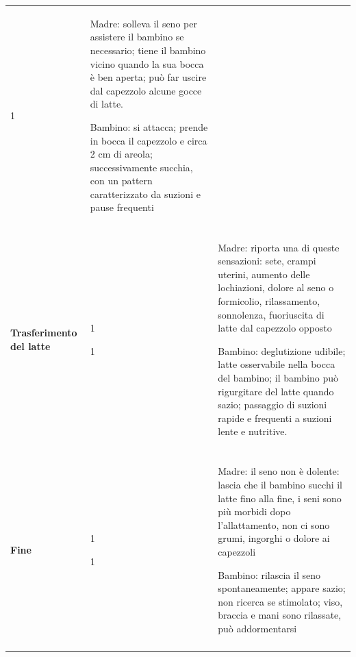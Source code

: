 \documentclass[]{article}
\begin{document}
\begin{longtable}[]{@{}lll@{}}
\begin{minipage}[t]{0.30\columnwidth}
1\strut
\end{minipage} & \begin{minipage}[t]{0.30\columnwidth}\raggedright
Madre: solleva il seno per assistere il bambino se necessario; tiene il
bambino vicino quando la sua bocca è ben aperta; può far uscire dal
capezzolo alcune gocce di latte.

Bambino: si attacca; prende in bocca il capezzolo e circa 2 cm di
areola; successivamente succhia, con un pattern caratterizzato da
suzioni e pause frequenti\strut
\end{minipage}\tabularnewline
& &\tabularnewline
\begin{minipage}[t]{0.30\columnwidth}\raggedright
\textbf{Trasferimento del latte}\strut
\end{minipage} & \begin{minipage}[t]{0.30\columnwidth}\raggedright
1

1\strut
\end{minipage} & \begin{minipage}[t]{0.30\columnwidth}\raggedright
Madre: riporta una di queste sensazioni: sete, crampi uterini, aumento
delle lochiazioni, dolore al seno o formicolio, rilassamento,
sonnolenza, fuoriuscita di latte dal capezzolo opposto

Bambino: deglutizione udibile; latte osservabile nella bocca del
bambino; il bambino può rigurgitare del latte quando sazio; passaggio di
suzioni rapide e frequenti a suzioni lente e nutritive.\strut
\end{minipage}\tabularnewline
& &\tabularnewline
\begin{minipage}[t]{0.30\columnwidth}\raggedright
\textbf{Fine}\strut
\end{minipage} & \begin{minipage}[t]{0.30\columnwidth}\raggedright
1

1\strut
\end{minipage} & \begin{minipage}[t]{0.30\columnwidth}\raggedright
Madre: il seno non è dolente: lascia che il bambino succhi il latte fino
alla fine, i seni sono più morbidi dopo l'allattamento, non ci sono
grumi, ingorghi o dolore ai capezzoli

Bambino: rilascia il seno spontaneamente; appare sazio; non ricerca se
stimolato; viso, braccia e mani sono rilassate, può addormentarsi\strut
\end{minipage}\tabularnewline
& &\tabularnewline
\bottomrule
\end{longtable}
\end{document}
